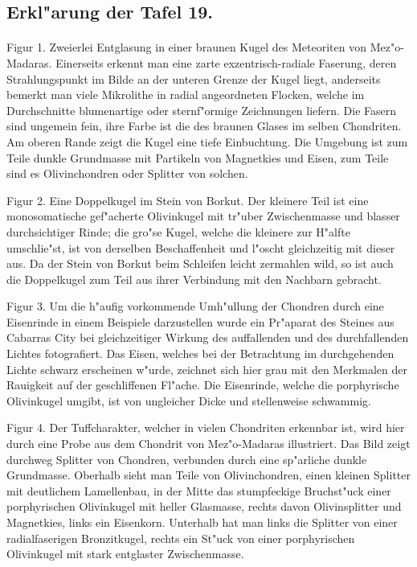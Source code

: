 \documentclass[a4paper, 11pt, oneside, polutonikogreek, german]{article}
\begin{document}
\subsection{Erkl"arung der Tafel 19.}
\paragraph{}
Figur 1. Zweierlei Entglasung in einer braunen Kugel des Meteoriten von Mez"o-Madaras. Einerseits erkennt man eine zarte exzentrisch-radiale Faserung, deren Strahlungspunkt im Bilde an der unteren Grenze der Kugel liegt, anderseits bemerkt man viele Mikrolithe in radial angeordneten Flocken, welche im Durchschnitte blumenartige oder sternf"ormige Zeichnungen liefern. Die Fasern sind ungemein fein, ihre Farbe ist die des braunen Glases im selben Chondriten. Am oberen Rande zeigt die Kugel eine tiefe Einbuchtung. Die Umgebung ist zum Teile dunkle Grundmasse mit Partikeln von Magnetkies und Eisen, zum Teile sind es Olivinchondren oder Splitter von solchen.

Figur 2. Eine Doppelkugel im Stein von Borkut. Der kleinere Teil ist eine monosomatische gef"acherte Olivinkugel mit tr"uber Zwischenmasse und blasser durchsichtiger Rinde; die gro"se Kugel, welche die kleinere zur H"alfte umschlie"st, ist von derselben Beschaffenheit und l"oscht gleichzeitig mit dieser aus. Da der Stein von Borkut beim Schleifen leicht zermahlen wild, so ist auch die Doppelkugel zum Teil aus ihrer Verbindung mit den Nachbarn gebracht.

Figur 3. Um die h"aufig vorkommende Umh"ullung der Chondren durch eine Eisenrinde in einem Beispiele darzustellen wurde ein Pr"aparat des Steines aus Cabarras City bei gleichzeitiger Wirkung des auffallenden und des durchfallenden Lichtes fotografiert. Das Eisen, welches bei der Betrachtung im durchgehenden Lichte schwarz erscheinen w"urde, zeichnet sich hier grau mit den Merkmalen der Rauigkeit auf der geschliffenen Fl"ache. Die Eisenrinde, welche die porphyrische Olivinkugel umgibt, ist von ungleicher Dicke und stellenweise schwammig.

Figur 4. Der Tuffcharakter, welcher in vielen Chondriten erkennbar ist, wird hier durch eine Probe aus dem Chondrit von Mez"o-Madaras illustriert. Das Bild zeigt durchweg Splitter von Chondren, verbunden durch eine sp"arliche dunkle Grundmasse. Oberhalb sieht man Teile von Olivinchondren, einen kleinen Splitter mit deutlichem Lamellenbau, in der Mitte das stumpfeckige Bruchst"uck einer porphyrischen Olivinkugel mit heller Glasmasse, rechts davon Olivinsplitter und Magnetkies, links ein Eisenkorn. Unterhalb hat man links die Splitter von einer radialfaserigen Bronzitkugel, rechts ein St"uck von einer porphyrischen Olivinkugel mit stark entglaster Zwischenmasse.
\clearpage
\end{document}
